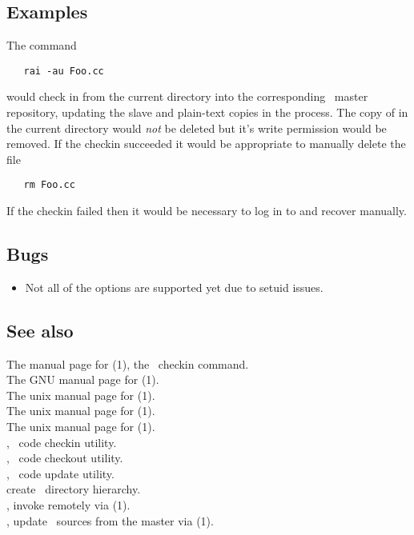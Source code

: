 \subsection*{Examples}
 
The command
 
\begin{verbatim}
   rai -au Foo.cc
\end{verbatim}
 
\noindent
would check in  from the current directory into the corresponding
\aipspp\ master repository, updating the slave and plain-text copies in the
process.  The copy of  in the current directory would \emph{not}
be deleted but it's write permission would be removed.  If the checkin
succeeded it would be appropriate to manually delete the file

\begin{verbatim}
   rm Foo.cc
\end{verbatim}
 
\noindent
If the checkin failed then it would be necessary to log in to
 and recover manually.

\subsection*{Bugs}

\begin{itemize}
\item
   Not all of the  options are supported yet due to setuid
   issues.
\end{itemize}

\subsection*{See also}

The manual page for (1), the \rcs\ checkin command.\\
The GNU manual page for (1).\\
The unix manual page for (1).\\
The unix manual page for (1).\\
The unix manual page for (1).\\
, \aipspp\ code checkin utility.\\
, \aipspp\ code checkout utility.\\
, \aipspp\ code update utility.\\
 create \aipspp\ directory hierarchy.\\
, invoke  remotely via (1).\\
, update \aipspp\ sources from the master via (1).
 
